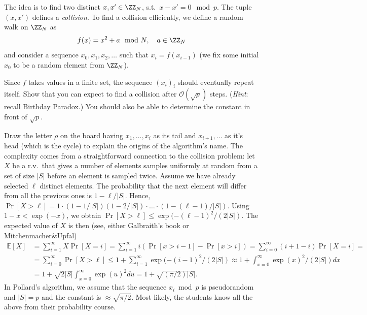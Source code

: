 \documentclass[11pt]{exam}
\theoremstyle{definition}
\begin{document}
{The idea is to find two distinct $x, x' \in \ZZ_N$, s.t.\ $x - x' = 0 \mod p$. %
The tuple $(x, x')$ defines a \emph{collision}. To find a collision efficiently, we define a random walk on $\ZZ_N$ as
\[
	f(x) = x^2 + a \mod N,  \quad a \in \ZZ_N
\] 
and consider a sequence $x_0, x_1, x_2, \ldots$ such that $x_i = f(x_{i-1})$ (we fix some initial $x_0$ to be a random element from $\ZZ_N$).
\begin{questions}
	\question Since $f$ takes values in a finite set, the sequence $(x_i)_i$ should eventually repeat itself. Show that you can expect to find a collision after $\mathcal{O}(\sqrt{p})$ steps. (\emph{Hint}: recall Birthday Paradox.) You should also be able to determine the constant in front of $\sqrt{p}$.
	\begin{solution}
		Draw the letter $\rho$ on the board having $x_1, \ldots, x_i$ as its tail and $x_{i+1}, \ldots$ as it's head (which is the cycle) to explain the origins of the algorithm's name.
		The complexity comes from a straightforward connection to the collision problem: let $X$ be a r.v.\ that gives a number of elements samples uniformly at random from a set of size $|S|$ before an element is sampled twice. Assume we have already selected $\ell$ distinct elements. The probability that the next element will differ from all the previous ones is $1-\ell/|S|$. Hence, $\Pr[X > \ell] = 1 \cdot (1-1/|S|)(1-2/|S|) \cdot \ldots \cdot (1-(\ell-1)/|S|)$. Using $1-x  < \exp(-x)$, we obtain $\Pr[X > \ell] \leq \exp(-(\ell-1)^2 / (2|S|)$. The expected value of $X$ is then (see, either Galbraith's book or Mitchenmacher\&Upfal)
		\begin{align*}
				\mathbb{E}[X] &= \sum_{i=1}^\infty X \Pr[X=i] = \sum_{i=1}^\infty i (\Pr[x>i-1] - \Pr[x>i]) = \sum_{i=0}^\infty (i+1-i) \Pr[X=i] = \\
									  &=\sum_{i=0}^\infty \Pr[X>\ell]  \leq 1 + \sum_{i=1}^\infty \exp(-(i-1)^2 / (2|S|) \approx 1 + \int_{x=0}^\infty \exp(x)^2 / (2|S|) dx \\
									  &= 1 + \sqrt{2 |S|} \int_{x=0}^{\infty} \exp(u)^2 du = 1+ \sqrt{(\pi/2)|S|}.
		\end{align*}
		In Pollard's algorithm, we assume that the sequence $x_i \bmod p$ is pseudorandom and $|S| = p$ and the constant is $\approx \sqrt{\pi/2}$. Most likely, the students know all the above from their probability course.
	

\end{solution}
\end{questions}}
\end{document}
